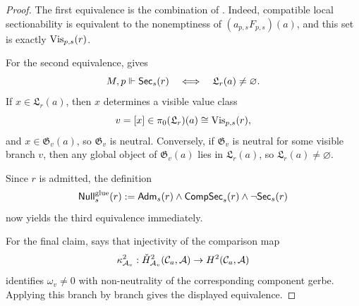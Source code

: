 \begin{proof}
The first equivalence is the combination of . Indeed, compatible local sectionability is equivalent to the nonemptiness of $(a_{p,s}F_{p,s})(a)$, and this set is exactly $\mathrm{Vis}_{p,s}(r)$.

For the second equivalence,  gives
\[
M,p\Vdash \mathsf{Sec}_s(r)
\quad\Longleftrightarrow\quad
\mathfrak L_r(a)\neq\varnothing.
\]
If $x\in \mathfrak L_r(a)$, then $x$ determines a visible value class
\[
v=[x]\in \pi_0(\mathfrak L_r)(a)\cong \mathrm{Vis}_{p,s}(r),
\]
and $x\in \mathfrak G_v(a)$, so $\mathfrak G_v$ is neutral. Conversely, if $\mathfrak G_v$ is neutral for some visible branch $v$, then any global object of $\mathfrak G_v(a)$ lies in $\mathfrak L_r(a)$, so $\mathfrak L_r(a)\neq\varnothing$.

Since $r$ is admitted, the definition
\[
\mathsf{Null}^{\mathrm{glue}}_s(r):=\mathsf{Adm}_s(r)\land \mathsf{CompSec}_s(r)\land \neg\mathsf{Sec}_s(r)
\]
now yields the third equivalence immediately.

For the final claim,  says
that injectivity of the comparison map
\[
\kappa^2_{\mathcal A_v}:
\check H^2_{\mathcal A_v}(\mathcal C_a,\mathcal{A})\to H^2(\mathcal C_a,\mathcal{A})
\]
identifies $\omega_v\neq 0$ with non-neutrality of the corresponding component
gerbe. Applying this branch by branch gives the displayed equivalence.
\end{proof}
